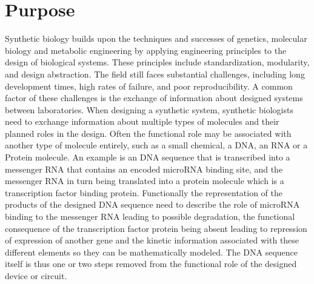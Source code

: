 \section{Purpose}



Synthetic biology builds upon the techniques and successes of genetics, molecular biology and metabolic engineering by applying engineering principles to the design of biological systems. These principles include standardization, modularity, and design abstraction. The field still faces substantial challenges, including long development times, high rates of failure, and poor reproducibility. A common factor of these challenges is the exchange of information about designed systems between laboratories. When designing a synthetic system,  synthetic biologists need to exchange information about multiple types of molecules and their planned roles in the design. Often the functional role may be associated with another type of molecule entirely, such as a small chemical, a DNA, an RNA or a Protein molecule. An example is an DNA sequence that is transcribed into a messenger RNA that contains an encoded microRNA binding site, and the messenger RNA in turn being translated into a protein molecule which is a transcription factor binding protein. Functionally the representation of the products of the designed DNA sequence need to describe the role of microRNA binding to the messenger RNA leading to possible  degradation, the functional consequence of the transcription factor protein being absent leading to repression of expression of another gene and the kinetic information associated with these different elements so they can be mathematically modeled. The DNA sequence itself is thus one or two steps removed from the functional role of the designed device or circuit. 


